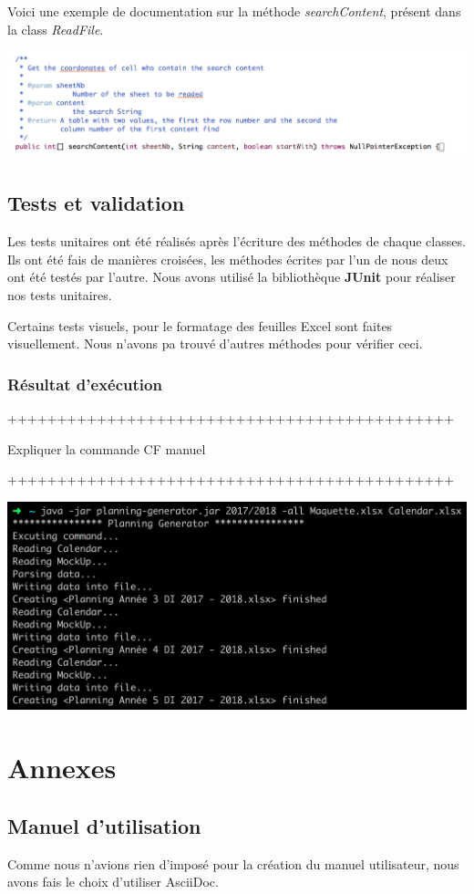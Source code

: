 \documentclass{polytech/polytech}
\begin{document}
	Voici une exemple de documentation sur la méthode \textit{searchContent}, présent dans la class \textit{ReadFile}.

	\includegraphics[width=\textwidth]{./img/documentation.png}
	
	\section{Tests et validation}
	
	Les tests unitaires ont été réalisés après l'écriture des méthodes de chaque classes.
	Ils ont été fais de manières croisées, les méthodes écrites par l'un de nous deux ont été testés par l'autre.
	Nous avons utilisé la bibliothèque \textbf{JUnit} pour réaliser nos tests unitaires.
	
	Certains tests visuels, pour le formatage des feuilles Excel sont faites visuellement.
	Nous n'avons pa trouvé d'autres méthodes pour vérifier ceci.
	
	\subsection{Résultat d'exécution}
	
	+++++++++++++++++++++++++++++++++++++++++++++
	
	Expliquer la commande CF manuel
	
	+++++++++++++++++++++++++++++++++++++++++++++
	
	\includegraphics[width=\textwidth]{./img/excution_result2.png}
	
	\chapter{Annexes}

	\section{Manuel d'utilisation}
	Comme nous n'avions rien d'imposé pour la création du manuel utilisateur, nous avons fais le choix d'utiliser AsciiDoc.

	
\end{document}
